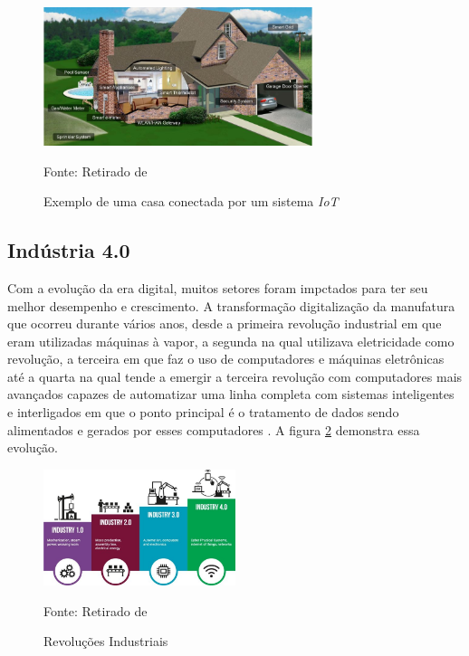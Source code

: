 \documentclass[../../layout.tex]{subfiles}
\begin{document}
\begin{figure}[H]
\centering
\caption{Exemplo de uma casa conectada por um sistema \emph{IoT}}
\includegraphics[width=0.7\textwidth]{assets/static/img/iothouse.jpg}
\label{fig:iothou}

\begin{minipage}{0.5\textwidth}
\raggedright \footnotesize Fonte: Retirado de  
\end{minipage}
\end{figure}

\subsection{Indústria 4.0}
\hspace*{3em}Com a evolução da era digital, muitos setores foram impctados para ter seu melhor desempenho e crescimento. A transformação digitalização da manufatura que ocorreu durante vários anos, desde a primeira revolução industrial em que eram utilizadas máquinas à vapor, a segunda na qual utilizava eletricidade como revolução, a terceira em que faz o uso de computadores e máquinas eletrônicas até a quarta na qual tende a emergir a terceira revolução com computadores mais avançados capazes de automatizar uma linha completa com sistemas inteligentes e interligados em que o ponto principal é o tratamento de dados sendo alimentados e gerados por esses computadores .
\hspace*{3em}A figura \ref{fig:ind} demonstra essa evolução.

\begin{figure}[H]
\centering
\caption{Revoluções Industriais}
\includegraphics[width=0.5\textwidth]{assets/static/img/ind4.jpg}
\label{fig:ind}

\begin{minipage}{0.7\textwidth}
\raggedright \footnotesize Fonte: Retirado de  
\end{minipage}
\end{figure}
\end{document}
